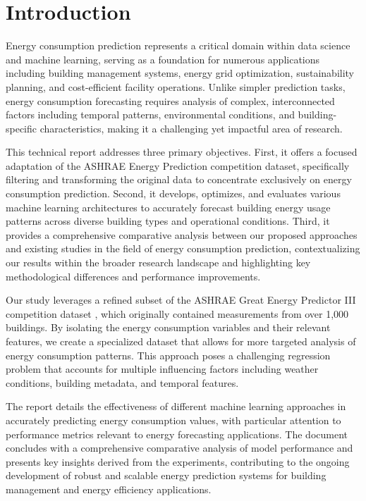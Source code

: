 \section{Introduction}
\label{sec:Introduction}
Energy consumption prediction represents a critical domain within data science and machine learning, serving as a foundation for numerous applications including building management systems, energy grid optimization, sustainability planning, and cost-efficient facility operations. Unlike simpler prediction tasks, energy consumption forecasting requires analysis of complex, interconnected factors including temporal patterns, environmental conditions, and building-specific characteristics, making it a challenging yet impactful area of research.

This technical report addresses three primary objectives. First, it offers a focused adaptation of the ASHRAE Energy Prediction competition dataset, specifically filtering and transforming the original data to concentrate exclusively on energy consumption prediction. Second, it develops, optimizes, and evaluates various machine learning architectures to accurately forecast building energy usage patterns across diverse building types and operational conditions. Third, it provides a comprehensive comparative analysis between our proposed approaches and existing studies in the field of energy consumption prediction, contextualizing our results within the broader research landscape and highlighting key methodological differences and performance improvements.

Our study leverages a refined subset of the ASHRAE Great Energy Predictor III competition dataset \cite{ashrae-energy-prediction}, which originally contained measurements from over 1,000 buildings. By isolating the energy consumption variables and their relevant features, we create a specialized dataset that allows for more targeted analysis of energy consumption patterns. This approach poses a challenging regression problem that accounts for multiple influencing factors including weather conditions, building metadata, and temporal features.

The report details the effectiveness of different machine learning approaches in accurately predicting energy consumption values, with particular attention to performance metrics relevant to energy forecasting applications. The document concludes with a comprehensive comparative analysis of model performance and presents key insights derived from the experiments, contributing to the ongoing development of robust and scalable energy prediction systems for building management and energy efficiency applications.

